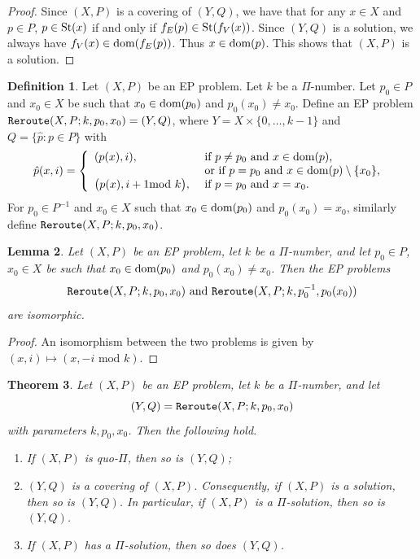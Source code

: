 \documentclass[11pt]{amsart}
\newtheorem{theorem}{Theorem}[section]
\newtheorem{lemma}[theorem]{Lemma}
\theoremstyle{definition}
\newtheorem{definition}[theorem]{Definition}
\newcommand{\dom}{{\mbox{\rm dom}}}
\theoremstyle{definition}
\numberwithin{equation}{section}
\begin{document}
\begin{proof} Since $(X,P)$ is a covering of $(Y, Q)$, we have that for any $x\in X$ and $p\in P$, $p\in \mbox{\rm St}(x)$ if and only if $f_E(p)\in \mbox{\rm St}(f_V(x))$. Since $(Y, Q)$ is a solution, we always have $f_V(x)\in \dom(f_E(p))$. Thus $x\in \dom(p)$. This shows that $(X, P)$ is a solution.
\end{proof}


\begin{definition} \label{def:reroute}
Let $(X,P)$ be an EP problem. Let $k$ be a $\Pi$-number. Let $p_0\in P$ and $x_0\in X$ be such that $x_0\in\dom(p_0)$ and $p_0(x_0)\neq x_0$. Define an EP problem $\mbox{\tt Reroute}(X, P; k, p_0, x_0)=(Y, Q)$, where $Y=X\times\{0,\dots, k-1\}$ and $Q=\{\hat{p}\colon p\in P\}$ with
$$ \hat{p}(x, i)=\left\{\begin{array}{ll} (p(x), i), & \mbox{ if $p\neq p_0$ and $x\in \dom(p)$,} \\
& \mbox{ or if $p=p_0$ and $x\in \dom(p)\setminus\{x_0\}$, } \\
\big(p(x), i+1\!\!\!\!\mod{k}\big), & \mbox{ if $p=p_0$ and $x=x_0$.}
\end{array}\right.
$$
For $p_0\in P^{-1}$ and $x_0\in X$ such that $x_0\in \dom(p_0)$ and $p_0(x_0)=x_0$, similarly define $\mbox{\tt Reroute}(X, P; k, p_0, x_0)$.
\end{definition}

\begin{lemma}\label{lem:inverse} Let $(X, P)$ be an EP problem, let $k$ be a $\Pi$-number, and let $p_0\in P$, $x_0\in X$ be such that $x_0\in \dom(p_0)$ and $p_0(x_0)\neq x_0$. Then the EP problems 
$$\mbox{\tt Reroute}(X, P; k, p_0, x_0) \mbox{ and } \mbox{\tt Reroute}(X, P; k, p_0^{-1}, p_0(x_0))$$ are isomorphic.
\end{lemma}

\begin{proof} An isomorphism between the two problems is given by $(x,i)\mapsto (x, -i \mbox{ mod } k)$.
\end{proof}

\begin{theorem}\label{thm:reroute} Let $(X, P)$ be an EP problem, let $k$ be a $\Pi$-number, and let 
$$(Y, Q)=\mbox{\tt Reroute}(X, P; k, p_0, x_0)$$ with parameters $k, p_0, x_0$. Then the following hold.
\begin{enumerate}
\item[\rm (i)] If $(X, P)$ is quo-$\Pi$, then so is $(Y, Q)$;
\item[\rm (ii)] $(Y, Q)$ is a covering of $(X, P)$. Consequently, if $(X, P)$ is a solution, then so is $(Y, Q)$. In particular, if $(X,P)$ is a $\Pi$-solution, then so is $(Y, Q)$.
\item[\rm (iii)] If $(X, P)$ has a $\Pi$-solution, then so does $(Y,Q)$.
\end{enumerate}
\end{theorem}
\end{document}
